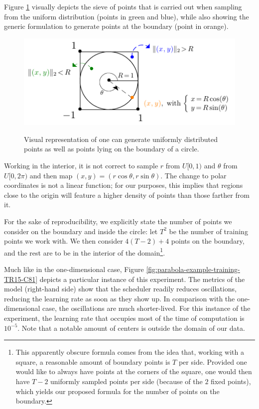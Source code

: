 \documentclass[12pt]{report} %
\begin{document}
Figure \ref{fig:uniform-circle} visually depicts the sieve of points that is carried out when sampling from the uniform distribution (points in green and blue), while also showing the generic formulation to generate points at the boundary (point in orange).

\begin{figure}[h]
  {\includegraphics[width=.8\textwidth]{imagenes/experiments/helpful_images/uniform_circle.pdf}}
  \caption{Visual representation of one can generate uniformly distributed points as well as points lying on the boundary of a circle.}
  \label{fig:uniform-circle}
\end{figure}

Working in the interior, it is not correct to sample $r$ from $U[0,1)$ and $\theta$ from $U[0,2\pi)$ and then map $(x,y)=(r \cos \theta, r \sin \theta)$. The change to polar coordinates is not a linear function; for our purposes, this implies that regions close to the origin will feature a higher density of points than those farther from it.

For the sake of reproducibility, we explicitly state the number of points we consider on the boundary and inside the circle: let $T^2$ be the number of training points we work with. We then consider $4 (T - 2) + 4$ points on the boundary, and the rest are to be in the interior of the domain\footnote{This apparently obscure formula comes from the idea that, working with a square, a reasonable amount of boundary points is $T$ per side. Provided one would like to always have points at the corners of the square, one would then have $T-2$ uniformly sampled points per side (because of the $2$ fixed points), which yields our proposed formula for the number of points on the boundary.}.

Much like in the one-dimensional case, Figure \ref{fig:parabola-example-training-TR15-C81} depicts a particular instance of this experiment. The metrics of the model (right-hand side) show that the scheduler readily reduces oscillations, reducing the learning rate as soon as they show up. In comparison with the one-dimensional case, the oscillations are much shorter-lived. For this instance of the experiment, the learning rate that occupies most of the time of computation is $10^{-5}$. Note that a notable amount of centers is outside the domain of our data.
\end{document}
